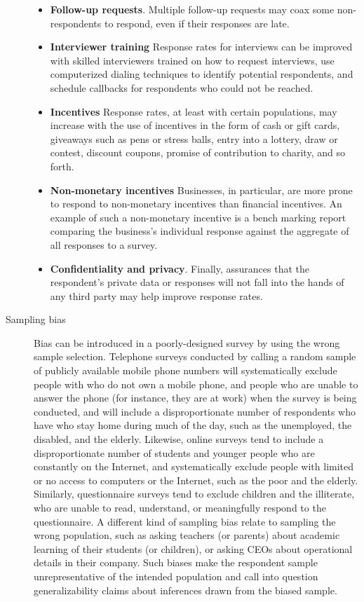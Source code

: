 \begin{description}
\begin{itemize}
	\item \textbf{Follow-up requests}. Multiple follow-up requests may coax some non-respondents to respond, even if their responses are late.

	\item \textbf{Interviewer training} Response rates for interviews can be improved with skilled interviewers trained on how to request interviews, use computerized dialing techniques to identify potential respondents, and schedule callbacks for respondents who could not be reached.

	\item \textbf{Incentives} Response rates, at least with certain populations, may increase with the use of incentives in the form of cash or gift cards, giveaways such as pens or stress balls, entry into a lottery, draw or contest, discount coupons, promise of contribution to charity, and so forth.

	\item \textbf{Non-monetary incentives} Businesses, in particular, are more prone to respond to non-monetary incentives than financial incentives. An example of such a non-monetary incentive is a bench marking report comparing the business's individual response against the aggregate of all responses to a survey.

	\item \textbf{Confidentiality and privacy}. Finally, assurances that the respondent's private data or responses will not fall into the hands of any third party may help improve response rates.
\end{itemize}

\item[Sampling bias] Bias can be introduced in a poorly-designed survey by using the wrong sample selection. Telephone surveys conducted by calling a random sample of publicly available mobile phone numbers will systematically exclude people with who do not own a mobile phone, and people who are unable to answer the phone (for instance, they are at work) when the survey is being conducted, and will include a disproportionate number of respondents who have who stay home during much of the day, such as the unemployed, the disabled, and the elderly. Likewise, online surveys tend to include a disproportionate number of students and younger people who are constantly on the Internet, and systematically exclude people with limited or no access to computers or the Internet, such as the poor and the elderly. Similarly, questionnaire surveys tend to exclude children and the illiterate, who are unable to read, understand, or meaningfully respond to the questionnaire. A different kind of sampling bias relate to sampling the wrong population, such as asking teachers (or parents) about academic learning of their students (or children), or asking CEOs about operational details in their company. Such biases make the respondent sample unrepresentative of the intended population and call into question generalizability claims about inferences drawn from the biased sample.


\end{description}
